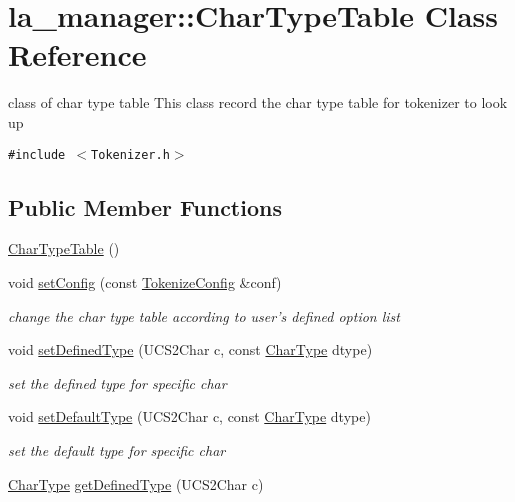 \hypertarget{classla__manager_1_1CharTypeTable}{
\section{la\_\-manager::CharTypeTable Class Reference}
\label{classla__manager_1_1CharTypeTable}
}
class of char type table This class record the char type table for tokenizer to look up  


{\tt \#include $<$Tokenizer.h$>$}

\subsection*{Public Member Functions}
\begin{CompactItemize}
\item 
\hyperlink{classla__manager_1_1CharTypeTable_4faeb450b4c48e55459ade19145652a2}{CharTypeTable} ()
\item 
void \hyperlink{classla__manager_1_1CharTypeTable_53548c650bdf26954fe3b4443290827c}{setConfig} (const \hyperlink{classla__manager_1_1TokenizeConfig}{TokenizeConfig} \&conf)
\begin{CompactList}\small\item\em change the char type table according to user's defined option list \item\end{CompactList}\item 
void \hyperlink{classla__manager_1_1CharTypeTable_de4d78b3913cb199ca359d989f73ab30}{setDefinedType} (UCS2Char c, const \hyperlink{namespacela__manager_aa4b42b4146948a208eabd25288ad99b}{CharType} dtype)
\begin{CompactList}\small\item\em set the defined type for specific char \item\end{CompactList}\item 
void \hyperlink{classla__manager_1_1CharTypeTable_6f3e4cc8a2f71aee53a5abf4734a2757}{setDefaultType} (UCS2Char c, const \hyperlink{namespacela__manager_aa4b42b4146948a208eabd25288ad99b}{CharType} dtype)
\begin{CompactList}\small\item\em set the default type for specific char \item\end{CompactList}\item 
\hyperlink{namespacela__manager_aa4b42b4146948a208eabd25288ad99b}{CharType} \hyperlink{classla__manager_1_1CharTypeTable_5b4079ad0b89f6c84053ee955e3bc312}{getDefinedType} (UCS2Char c)

\end{CompactItemize}
